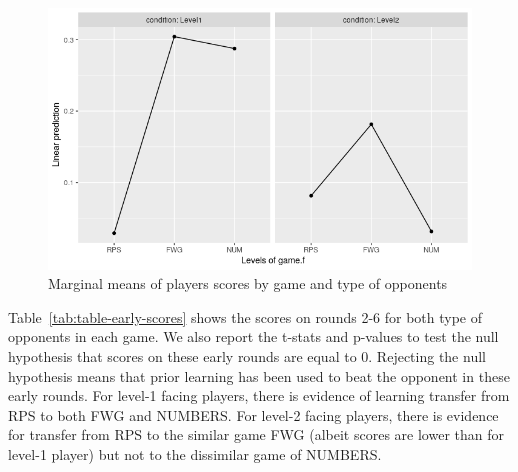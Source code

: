 \documentclass[man,floatsintext]{apa6}
\begin{document}
\begin{figure}

{\centering \includegraphics{../Report/images/exp1_earlyScore_by_opp} 

}

\caption{Marginal means of players scores by game and type of opponents}\label{fig:exp1-score-by-opp}
\end{figure}

Table~\ref{tab:table-early-scores} shows the scores on rounds 2-6 for both type of opponents in each game. We also report the t-stats and p-values to test the null hypothesis that scores on these early rounds are equal to 0. Rejecting the null hypothesis means that prior learning has been used to beat the opponent in these early rounds. For level-1 facing players, there is evidence of learning transfer from RPS to both FWG and NUMBERS. For level-2 facing players, there is evidence for transfer from RPS to the similar game FWG (albeit scores are lower than for level-1 player) but not to the dissimilar game of NUMBERS.
\end{document}
